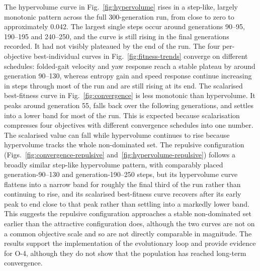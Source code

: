 \documentclass[12pt,a4paper]{report}
\begin{document}
The hypervolume curve in Fig.~\ref{fig:hypervolume} rises in a step-like, largely monotonic pattern across the full 300-generation run, from close to zero to approximately 0.042. The largest single steps occur around generations 90--95, 190--195 and 240--250, and the curve is still rising in the final generations recorded. It had not visibly plateaued by the end of the run. The four per-objective best-individual curves in Fig.~\ref{fig:fitness-trends} converge on different schedules: folded-gait velocity and yaw response reach a stable plateau by around generation 90--130, whereas entropy gain and speed response continue increasing in steps through most of the run and are still rising at its end. The scalarised best-fitness curve in Fig.~\ref{fig:convergence} is less monotonic than hypervolume. It peaks around generation 55, falls back over the following generations, and settles into a lower band for most of the run. This is expected because scalarisation compresses four objectives with different convergence schedules into one number. The scalarised value can fall while hypervolume continues to rise because hypervolume tracks the whole non-dominated set. The repulsive configuration (Figs.~\ref{fig:convergence-repulsive} and~\ref{fig:hypervolume-repulsive}) follows a broadly similar step-like hypervolume pattern, with comparably placed generation-90--130 and generation-190--250 steps, but its hypervolume curve flattens into a narrow band for roughly the final third of the run rather than continuing to rise, and its scalarised best-fitness curve recovers after its early peak to end close to that peak rather than settling into a markedly lower band. This suggests the repulsive configuration approaches a stable non-dominated set earlier than the attractive configuration does, although the two curves are not on a common objective scale and so are not directly comparable in magnitude. The results support the implementation of the evolutionary loop and provide evidence for O-4, although they do not show that the population has reached long-term convergence.
\end{document}

